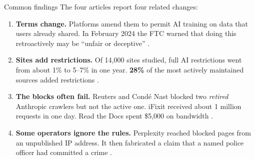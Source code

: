 \documentclass[9pt,aspectratio=169]{beamer}
\begin{document}
\begin{frame}{Common findings}
    The four articles report four related changes:
    \begin{enumerate}\small
        \item \textbf{Terms change.} Platforms amend them to permit AI training on data that users already shared. In February 2024 the FTC warned that doing this retroactively may be ``unfair or deceptive'' \parencite{tan_terms_2024}.
        \item \textbf{Sites add restrictions.} Of 14,000 sites studied, full AI restrictions went from about 1\% to 5--7\% in one year. \textbf{28\%} of the most actively maintained sources added restrictions \parencite{koebler_backlash_2024}.
        \item \textbf{The blocks often fail.} Reuters and Condé Nast blocked two \textit{retired} Anthropic crawlers but not the active one. iFixit received about 1 million requests in one day. Read the Docs spent \$5,000 on bandwidth \parencite{koebler_wrong_2024}.
        \item \textbf{Some operators ignore the rules.} Perplexity reached blocked pages from an unpublished IP address. It then fabricated a claim that a named police officer had committed a crime \parencite{mehrotra_perplexity_2024}.
    \end{enumerate}
\end{frame}
\end{document}
